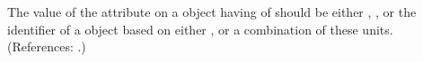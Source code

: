 The value of the attribute  on a \Compartment object having
 of  should be either
, , or the identifier of a \UnitDefinition
object based on either  , or a combination of these units.  (References: .)
